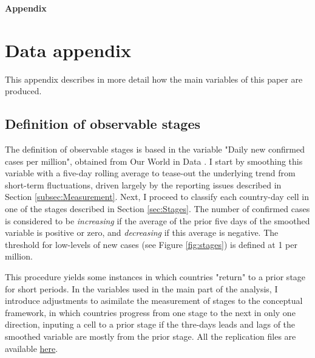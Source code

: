 \documentclass[12pt,english]{article}
\begin{document}
\pagebreak{}

\setlength\bibsep{0.65pt}
\setlength{\parskip}{0.1em}





\pagebreak{}



\appendix
\vphantom{}
\begin{center}
\textbf{\LARGE{}Appendix}
\par\end{center}{\LARGE \par}

\setcounter{figure}{0} \renewcommand{\thefigure}{A.\arabic{figure}}
\setcounter{table}{0} \renewcommand{\thetable}{A.\arabic{table}}


\section{Data appendix\label{sec:DataAppendix}}


This appendix describes in more detail how the main variables of this paper are produced.

\subsection{Definition of observable stages}

The definition of observable stages is based in the variable "Daily new confirmed cases per million", obtained from Our World in Data \citep{Roser2020}. I start by smoothing this variable with a five-day rolling average to tease-out the underlying trend from short-term fluctuations, driven largely by the reporting issues described in Section \ref{subsec:Measurement}.  Next, I proceed to classify each country-day cell in one of the stages described in Section \ref{sec:Stages}. The number of confirmed cases is considered to be \emph{increasing} if the average of the prior five days of the smoothed variable is positive or zero, and \emph{decreasing} if this average is negative. The threshold for low-levels of new cases (see Figure \ref{fig:stages}) is defined at 1 per million.

This procedure yields some instances in which countries "return" to a prior stage for short periods. In the variables used in the main part of the analysis, I introduce adjustments to asimilate the measurement of stages to the conceptual framework, in which countries progress from one stage to the next in only one direction, inputing a cell to a prior stage if the thre-days leads and lags of the smoothed variable are mostly from the prior stage.  All the replication files are available \href{https://github.com/jpchauvin/covid_policies}{here}.
\end{document}
